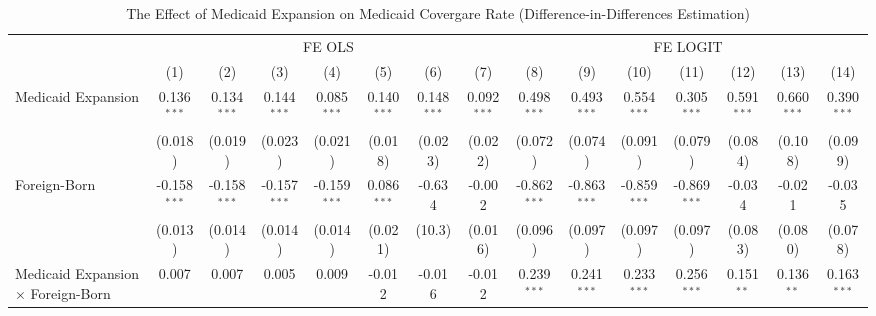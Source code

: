 \documentclass[
]{article}
\begin{document}
\newpage
\begin{landscape}

\begin{table}[htbp]
   \centering
   \large
   \begin{adjustbox}{width = 1.5\textwidth, center}
      \begin{threeparttable}[b]
         \caption{The Effect of Medicaid Expansion on Medicaid Covergare Rate (Difference-in-Differences Estimation)}
         \renewcommand*{\arraystretch}{1.75}
         \begin{tabular}{lcccccccccccccc}
            \tabularnewline \midrule \midrule
             & \multicolumn{7}{c}{FE OLS} & \multicolumn{7}{c}{FE LOGIT} \\ \cmidrule(lr){2-8} \cmidrule(lr){9-15}
                                                      & (1)            & (2)            & (3)            & (4)            & (5)           & (6)           & (7)           & (8)            & (9)            & (10)           & (11)           & (12)          & (13)          & (14)\\  
            \midrule 
            Medicaid Expansion                        & 0.136$^{***}$  & 0.134$^{***}$  & 0.144$^{***}$  & 0.085$^{***}$  & 0.140$^{***}$ & 0.148$^{***}$ & 0.092$^{***}$ & 0.498$^{***}$  & 0.493$^{***}$  & 0.554$^{***}$  & 0.305$^{***}$  & 0.591$^{***}$ & 0.660$^{***}$ & 0.390$^{***}$\\   
                                                      & (0.018)        & (0.019)        & (0.023)        & (0.021)        & (0.018)       & (0.023)       & (0.022)       & (0.072)        & (0.074)        & (0.091)        & (0.079)        & (0.084)       & (0.108)       & (0.099)\\   
            Foreign-Born                              & -0.158$^{***}$ & -0.158$^{***}$ & -0.157$^{***}$ & -0.159$^{***}$ & 0.086$^{***}$ & -0.634        & -0.002        & -0.862$^{***}$ & -0.863$^{***}$ & -0.859$^{***}$ & -0.869$^{***}$ & -0.034        & -0.021        & -0.035\\   
                                                      & (0.013)        & (0.014)        & (0.014)        & (0.014)        & (0.021)       & (10.3)        & (0.016)       & (0.096)        & (0.097)        & (0.097)        & (0.097)        & (0.083)       & (0.080)       & (0.078)\\   
            Medicaid Expansion $\times$ Foreign-Born  & 0.007          & 0.007          & 0.005          & 0.009          & -0.012        & -0.016        & -0.012        & 0.239$^{***}$  & 0.241$^{***}$  & 0.233$^{***}$  & 0.256$^{***}$  & 0.151$^{**}$  & 0.136$^{**}$  & 0.163$^{***}$\\   

\end{tabular}
\end{threeparttable}
\end{adjustbox}
\end{table}
\end{landscape}
\end{document}
